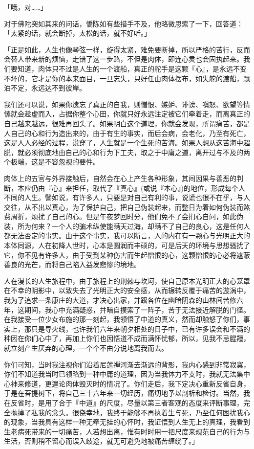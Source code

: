 \documentclass[twoside,openany]{book}
\begin{document}
「哦，对……」

对于佛陀突如其来的问话，憍陈如有些措手不及，他略微思索了一下，回答道：「太紧的话，就会断掉，太松的话，就不好听。」

「正是如此，人生也像琴弦一样，旋得太紧，难免要断掉，所以严格的苦行，反而会替人带来新的烦恼，走错了这一步路，不但是肉体，即连心灵也会固执起来。我们要知道，肉体只不过是人生的一个渡船，真正的舵手是这颗『心』，是永远不变不坏的，它才是你的本来面目，一旦忘失，只好任由肉体摆布，如失舵的渡船，飘泊不定，永远达不到彼岸。

我们还可以说，如果你遗忘了真正的自我，则憎恨、嫉妒、诽谤、嗔怒、欲望等情愫就会趁虚而入，占据你整个心田，你就只好永远注定被它们牵着走，而离真正的自己越来越远，很难再回头了。如果明白这个道理，你就会发现，所谓痛苦，都是人自己的心和行为造出来的，由于有生的事实，而后会病，会老化，乃至有死亡，这是人人必经的过程，说穿了，人生就是一个生死的苦海。如果人想从这苦海中超脱，就必须彻底地由自己的心和行为下工夫，取之于中庸之道，离开过与不及的两个极端，这是不容忽视的要件。

肉体上的五官与外界接触后，自然会在心上产生各种形象，其间因果与善恶的判断，本应仍由『心』来担任，取代了『真心』(或说『本心』)的地位，形成每个人不同的人生。譬如说，有许多人，只要是对自己有利的事，说谎也很不在乎，与人交往，从不出以真心，为了保护自己，把自己伪装起来，而整日为着如何伪装而煞费周折，烦扰了自己的心。但是午夜梦回时分，他们免不了会扪心自问，如此伪装，所为何来？一个人的骗术纵使能瞒天过海，却瞒不了自己的良心，这是任何人都无法否定的事实。由于这个事实，我可以断言，人的内在有一颗心与光明正大的本体同源，人在初降人世时，心本是圆润而丰硕的，可是后天的环境与思想骚扰了它，你不见有许多人，由于受到某种伤害而生起憎恨的心，这颗憎恨的心必将遮蔽善良的光芒，而将自己陷入益发悲惨的境地。

人在漫长的人生旅程中，由于旅程上的荆棘与坎坷，使自己原本光明正大的心笼罩在不幸的阴影中，以致失去了光明正大的安全感，从而辗转反覆于痛苦的漩涡中，我为了追求一条康庄的大道，才决心出家，并跟各位在幽暗阴森的山林间苦修六年，这期间，我心中充满疑惑，并暗自摸索了一阵子，苦于无法接近解脱的门径。在我接受一位少女布施的那一刻起，我领悟了中道的真义，然而却触怒了你们，事实上，那只是导火线，也许我们六年来朝夕相处的日子中，已有许多误会和不满的种因在你们心中了，再加上你们也因悟道不成而满怀忧郁，所以，见我不忌腥羶，就立刻产生厌弃的心理，一个个不由分说地离我而去。

你们可知，当时我注视你们沿着尼莲禅河渐去渐远的背影，我内心感到非常寂寞，你们不知道我当时已领略到一种中庸的道理，因为当我体力不支时，我就无法集中心神来修道，更遑论肉体毁灭时的情况了。你们走后，我下定决心重新反省自身，于是在菩提树下，将自己三十六年来一切经历，痛切地予以剖析和检讨。当然，我在反省时，是用了合于『中道』的尺度，尽量以第三者客观的态度来评断事理，完全抛掉了私我的念头。很侥幸地，我终于能够不再执着生与死，乃至任何困扰我心的现象，当我具有这样一种无牵无挂的心怀时，我证悟到人生无上的真理，我看到生老病死带来的一切痛苦，人若想出离，惟有时时用一把尺度来规范自己的行为与生活，否则稍不留心而误入歧途，就无可避免地被痛苦缠绕了。」
\end{document}
